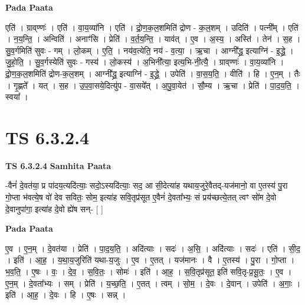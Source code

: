 \documentclass[17pt]{extarticle}
\begin{document}
\textbf{Pada Paata} \newline

एति॑ । ग्राव्‌ण्णः॑ । एति॑ । वा॒य॒व्या॑नि । एति॑ । द्रो॒ण॒क॒ल॒शमिति॑ द्रोण - क॒ल॒शम् । उदिति॑ । पत्नी᳚म् । एति॑ । न॒य॒न्ति॒ । अन्विति॑ । अनाꣳ॑सि । प्रेति॑ । व॒र्त॒य॒न्ति॒ । याव॑त् । ए॒व । अ॒स्य॒ । अस्ति॑ । तेन॑ । स॒ह । सु॒व॒र्गमिति॑ सुवः - गम् । लो॒कम् । ए॒ति॒ । नय॑व॒त्येति॒ नय॑ - व॒त्या॒ । ऋ॒चा । आग्नी᳚द्ध्र॒ इत्याग्नि॑ - इ॒द्ध्रे॒ । जु॒हो॒ति॒ । सु॒व॒र्गस्येति॑ सुवः - गस्य॑ । लो॒कस्य॑ । अ॒भिनी᳚त्या॒ इत्य॒भि-नी॒त्यै॒ । ग्राव्‌ण्णः॑ । वा॒य॒व्या॑नि । द्रो॒ण॒क॒ल॒शमिति॑ द्रोण-क॒ल॒शम् । आग्नी᳚द्ध्र॒ इत्याग्नि॑ - इ॒द्ध्रे॒ । उपेति॑ । वा॒स॒य॒ति॒ । वीति॑ । हि । ए॒न॒म् । तैः । गृ॒ह्णते᳚ । यत् । स॒ह । उ॒प॒वा॒सये॒दित्यु॑प - वा॒सये᳚त् । अ॒पु॒वा॒येत॑ । सौ॒म्य । ऋ॒चा । प्रेति॑ । पा॒द॒य॒ति॒ । स्वया᳚ ।  \newline




\section*{ TS 6.3.2.4 }

\textbf{TS 6.3.2.4 } \newline
\textbf{Samhita Paata} \newline

-वैनं॑ दे॒वत॑या॒ प्र पा॑दय॒त्यदि॑त्याः॒ सदो॒ऽस्यदि॑त्याः॒ सद॒ आ सी॒देत्या॑ह यथाय॒जुरे॒वैतद्-यज॑मानो॒ वा ए॒तस्य॑ पु॒रा गो॒प्ता भ॑वत्ये॒ष वो॑ देव सवितः॒ सोम॒ इत्या॑ह सवि॒तृप्र॑सूत ए॒वैनं॑ दे॒वता᳚भ्यः॒ सं प्रय॑च्छत्ये॒तत् त्वꣳ सो॑म दे॒वो दे॒वानुपा॑गा॒ इत्या॑ह दे॒वो ह्ये॑ष सन्- [  ] \newline

\textbf{Pada Paata} \newline

ए॒व । ए॒न॒म् । दे॒वत॑या । प्रेति॑ । पा॒द॒य॒ति॒ । अदि॑त्याः । सदः॑ । अ॒सि॒ । अदि॑त्याः । सदः॑ । एति॑ । सी॒द॒ । इति॑ । आ॒ह॒ । य॒था॒य॒जुरिति॑ यथा-य॒जुः । ए॒व । ए॒तत् । यज॑मानः । वै । ए॒तस्य॑ । पु॒रा । गो॒प्ता । भ॒व॒ति॒ । ए॒षः । वः॒ । दे॒व॒ । स॒वि॒तः॒ । सोमः॑ । इति॑ । आ॒ह॒ । स॒वि॒तृप्र॑सूत॒ इति॑ सवि॒तृ-प्र॒सू॒तः॒ । ए॒व । ए॒न॒म् । दे॒वता᳚भ्यः । सम् । प्रेति॑ । य॒च्छ॒ति॒ । ए॒तत् । त्वम् । सो॒म॒ । दे॒वः । दे॒वान् । उपेति॑ । अ॒गाः॒ । इति॑ । आ॒ह॒ । दे॒वः । हि । ए॒षः । सन्न् ।  \newline




\end{document}
